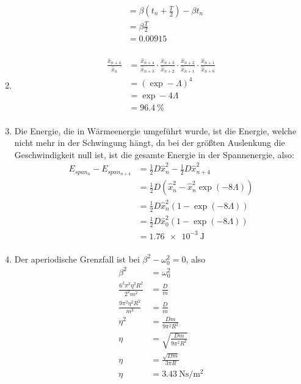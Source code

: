 \documentclass[sectionformat = exercise]{gadsescript}
\begin{document}
\begin{enumerate}[label=\alph*)]
\begin{align*}
			~ &= \beta \left(t_n+\frac{ T }{ 2 }\right) -\beta t_n\\
			~ &= \beta \frac{ T }{ 2 }\\
			~ &= \num{ 0.00915 } \\
		\end{align*}
	\item 
		\begin{align*}
			\frac{ \hat{x}_{n+4}  }{ \hat{x}_n } &= \frac{ \hat{x}_{n+4 }}{ \hat{x}_{n+3} } \cdot \frac{ \hat{x}_{n+3}}{ \hat{x}_{n+2} } \cdot \frac{ \hat{x}_{n+2}}{ \hat{x}_{n+1} } \cdot \frac{ \hat{x}_{n+1}}{ \hat{x}_{n+0} }\\
			~ &= (\exp -\Lambda)^4 \\
			~ &= \exp -4\Lambda \\
			~ &= \qty[exponent-mode = input]{ 96.4 }{ \percent } \\
		\end{align*}
	\item Die Energie, die in Wärmeenergie umgeführt wurde, ist die Energie, welche nicht mehr in der Schwingung hängt, da bei der größten Auslenkung die Geschwindigkeit null ist, ist die gesamte Energie in der Spannenergie, also:
		\begin{align*}
			E_{span_n} - E_{span_{n+4}} &= \frac{ 1 }{ 2 } D \hat{x}_n^2 - \frac{ 1 }{ 2 } D \hat{x}_{n+4}^2 \\
			~ &= \frac{ 1 }{ 2 } D \left( \hat{x}_{n}^2 - \hat{x}_{n}^2\exp (-8\Lambda) \right)  \\
			~ &= \frac{ 1 }{ 2 } D \hat{x}_{n}^2 \left( 1 - \exp (-8\Lambda) \right) \\
			~ &= \frac{ 1 }{ 2 } D \hat{x}_{0}^2 \left( 1 - \exp (-8\Lambda) \right) \\
			~ &= \qty{ 1.76e-3 }{ \joule } \\
		\end{align*}
	\item Der aperiodische Grenzfall ist bei $ \beta^2 - \omega_0^2 = 0 $, also
		\begin{align*}
			\beta^2 &= \omega_0^2 \\
			\frac{6^2\pi^2 \eta^2 R^2}{ 2^2m^2 } &= \frac{ D }{ m }  \\
			\frac{9\pi^2 \eta^2 R^2}{ m^2 } &= \frac{ D }{ m }  \\
			\eta^2 &= \frac{ Dm }{ 9\pi^2R^2 }  \\
			\eta &= \sqrt{\frac{ Dm }{ 9\pi^2R^2 }}  \\
			\eta &= \frac{\sqrt{Dm}}{ 3\pi R }  \\
			\eta &= \qty{ 3.43 }{ \newton\second\per\square\metre }  \\
		\end{align*}
		
\end{enumerate}
\end{document}
